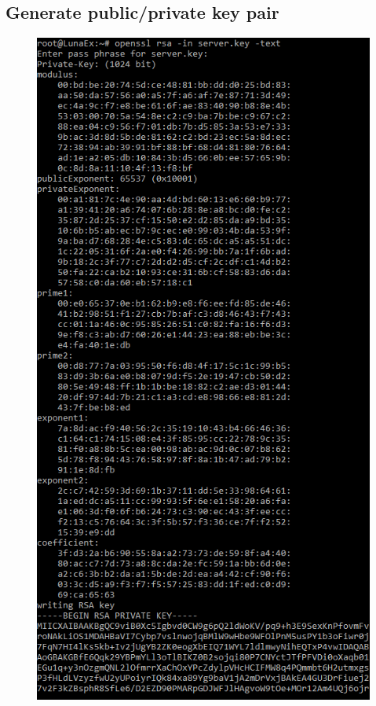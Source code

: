 \documentclass{article}
\begin{document}
\subsection{Generate public/private key pair}
\begin{figure}[H]\centering\includegraphics{2-1.png}\end{figure}
\end{document}
